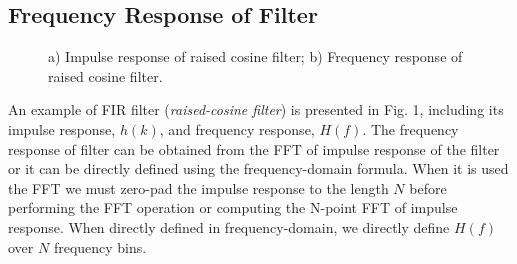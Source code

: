 \documentclass[a4paper]{article}
\begin{document}
\subsection{Frequency Response of Filter}
\begin{figure}[h!]
    \centering
    \qquad
    \caption{ a) Impulse response of raised cosine filter; b) Frequency response  of raised cosine filter. }%
    \label{BER_InputPower}%
\end{figure}
An example of FIR filter (\textit{raised-cosine filter}) is presented in Fig. 1, including its impulse response, $h(k)$, and frequency response, $H(f)$. The frequency response of filter can be obtained from the FFT of impulse response of the filter or it can be directly defined using the frequency-domain formula. When it is used the FFT we must zero-pad the impulse response to the length $N$ before performing the FFT operation or computing the N-point FFT of impulse response. When directly defined in frequency-domain, we directly define $H(f)$ over $N$ frequency bins.
\end{document}
